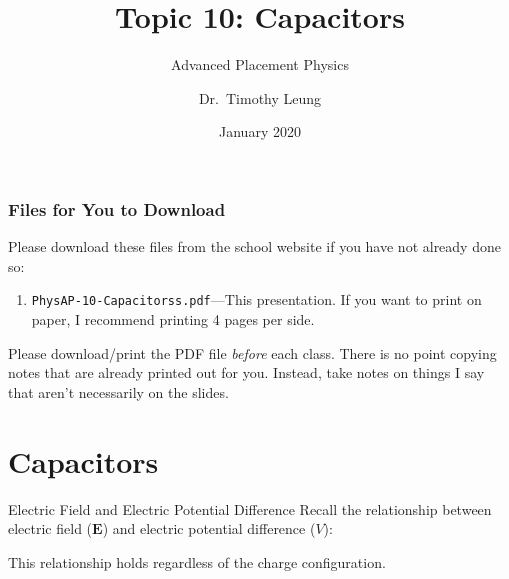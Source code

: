 \documentclass[12pt,aspectratio=169]{beamer}
\title{Topic 10: Capacitors}
\subtitle{Advanced Placement Physics}
\author[TML]{Dr.\ Timothy Leung}
\institute{Olympiads School, Toronto, ON, Canada}
\date{January 2020}
\newcommand{\mb}[1]{\mathbf{#1}}
\newcommand{\eq}[2]{\vspace{#1}{\Large\begin{displaymath}#2\end{displaymath}}}
\begin{document}
\begin{frame}
  \maketitle
\end{frame}


\begin{frame}
  \frametitle{Files for You to Download}
  Please download these files from the school website if you have not already
  done so:
  \begin{enumerate}
  \item\texttt{PhysAP-10-Capacitorss.pdf}---This presentation. If you want to
    print on paper, I recommend printing 4 pages per side.
  \end{enumerate}

  \vspace{.2in}Please download/print the PDF file \emph{before} each class.
  There is no point copying notes that are already printed out for you.
  Instead, take notes on things I say that aren't necessarily on the slides.
\end{frame}



\section{Capacitors}

\begin{frame}{Electric Field and Electric Potential Difference}
  Recall the relationship between electric field ($\mb{E}$) and electric
  potential difference ($V$):
    
  \eq{-.2in}{
    \mb{E}=-\frac{\partial V}{\partial r}\hat{\mb{r}}
  }

  This relationship holds regardless of the charge configuration.
\end{frame}
\end{document}
